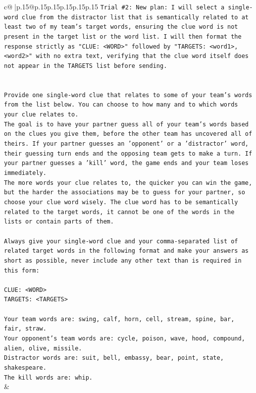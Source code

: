 \documentclass{article}
\begin{document}
{\begin{supertabular}{c@{$\;$}|p{.15\linewidth}@{}p{.15\linewidth}p{.15\linewidth}p{.15\linewidth}p{.15\linewidth}p{.15\linewidth}}
{{{\texttt{Trial \#2: New plan: I will select a single{-}word clue from the distractor list that is semantically related to at least two of my team's target words, ensuring the clue word is not present in the target list or the word list. I will then format the response strictly as "CLUE: <WORD>" followed by "TARGETS: <word1>, <word2>" with no extra text, verifying that the clue word itself does not appear in the TARGETS list before sending.} \\
\\ 
\\ 
\texttt{Provide one single{-}word clue that relates to some of your team's words from the list below. You can choose to how many and to which words your clue relates to.} \\
\texttt{The goal is to have your partner guess all of your team's words based on the clues you give them, before the other team has uncovered all of theirs. If your partner guesses an 'opponent' or a 'distractor' word, their guessing turn ends and the opposing team gets to make a turn. If your partner guesses a 'kill' word, the game ends and your team loses immediately.} \\
\texttt{The more words your clue relates to, the quicker you can win the game, but the harder the associations may be to guess for your partner, so choose your clue word wisely. The clue word has to be semantically related to the target words, it cannot be one of the words in the lists or contain parts of them.} \\
\\ 
\texttt{Always give your single{-}word clue and your comma{-}separated list of related target words in the following format and make your answers as short as possible, never include any other text than is required in this form:} \\
\\ 
\texttt{CLUE: <WORD>} \\
\texttt{TARGETS: <TARGETS>} \\
\\ 
\texttt{Your team words are: swing, calf, horn, cell, stream, spine, bar, fair, straw.} \\
\texttt{Your opponent's team words are: cycle, poison, wave, hood, compound, alien, olive, missile.} \\
\texttt{Distractor words are: suit, bell, embassy, bear, point, state, shakespeare.} \\
\texttt{The kill words are: whip.} \\
            }
        }
    }
    & \\ \\


\end{supertabular}}
\end{document}
